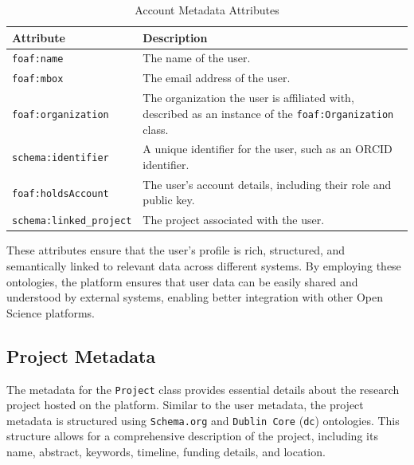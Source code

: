 \documentclass{article}
\begin{document}
\begin{table}[h]
      \centering
      \begin{tabular}{|l|l|}
            \hline
            \textbf{Attribute}              & \textbf{Description}                                                                                            \\ \hline
            \texttt{foaf:name}              & The name of the user.                                                                                           \\ \hline
            \texttt{foaf:mbox}              & The email address of the user.                                                                                  \\ \hline
            \texttt{foaf:organization}      & The organization the user is affiliated with, described as an instance of the \texttt{foaf:Organization} class. \\ \hline
            \texttt{schema:identifier}      & A unique identifier for the user, such as an ORCID identifier.                                                  \\ \hline
            \texttt{foaf:holdsAccount}      & The user's account details, including their role and public key.                                                \\ \hline
            \texttt{schema:linked\_project} & The project associated with the user.                                                                           \\ \hline
      \end{tabular}
      \caption{Account Metadata Attributes}
\end{table}

These attributes ensure that the user's profile is rich, structured, and semantically linked to relevant data across different systems. By employing these ontologies, the platform ensures that user data can be easily shared and understood by external systems, enabling better integration with other Open Science platforms.

\subsection{Project Metadata}
The metadata for the \texttt{Project} class provides essential details about the research project hosted on the platform. Similar to the user metadata, the project metadata is structured using \texttt{Schema.org} and \texttt{Dublin Core} (\texttt{dc}) ontologies. This structure allows for a comprehensive description of the project, including its name, abstract, keywords, timeline, funding details, and location.
\end{document}
